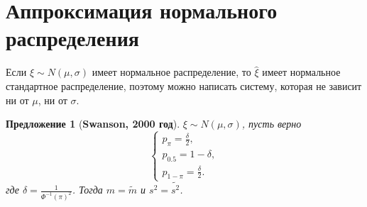 \documentclass[12pt]{article}
\newtheorem{proposition}[theorem]{Предложение}
\begin{document}
	\section{Аппроксимация нормального распределения}
	Если $\xi\sim N(\mu, \sigma) $ имеет нормальное распределение, то
	$\hat{\xi}$ имеет нормальное стандартное распределение, поэтому можно написать систему, которая не зависит ни от $\mu$, ни от $\sigma$.
	
	\begin{proposition}[\textbf{Swanson, 2000 год}]\label{pr7}
		$\xi\sim N(\mu, \sigma)$, пусть верно 
		\begin{equation}
			\begin{cases}
				p_{\pi} = \displaystyle{\frac{\delta}{2}},\\ 
				p_{0.5}=1-\delta , \\ 
				p_{1-\pi}=\displaystyle{\frac{\delta}{2}}.
			\end{cases}\label{7}
		\end{equation}
		где $\delta  = \displaystyle{\frac{1}{\Phi ^{-1}(\pi)^{2}}}$. Тогда $m=\tilde{m}$ и $s^{2} = \tilde{s^{2}}$.
	\end{proposition}
\end{document}
